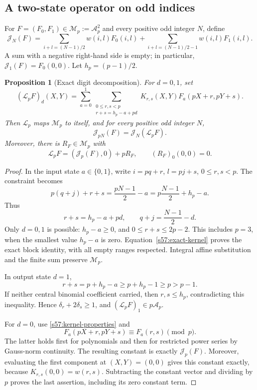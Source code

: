 \documentclass[11pt,a4paper]{article}
\numberwithin{equation}{section}
\newtheorem{proposition}[theorem]{Proposition}
\theoremstyle{remark}
\begin{document}
\subsection{A two-state operator on odd indices}

For \(F=(F_0,F_1)\in\mathcal M_p:=\mathcal A_p^2\) and every
positive odd integer \(N\), define
\[
 \mathcal J_N(F)=
 \sum_{i+l=(N-1)/2}w(i,l)F_0(i,l)
 +\sum_{i+l=(N-1)/2-1}w(i,l)F_1(i,l).
\]
A sum with a negative right-hand side is empty; in particular,
\(\mathcal J_1(F)=F_0(0,0)\). Let \(h_p=(p-1)/2\).

\begin{proposition}[Exact digit decomposition]
\label{s57:digit-operator}
For \(d=0,1\), set
\[
 (\mathcal L_pF)_d(X,Y)=
 \sum_{a=0}^1
 \sum_{\substack{0\le r,s<p\\r+s=h_p-a+pd}}
 K_{r,s}(X,Y)F_a(pX+r,pY+s).
\]
Then \(\mathcal L_p\) maps \(\mathcal M_p\) to itself, and for
every positive odd integer \(N\),
\[
                   \mathcal J_{pN}(F)=\mathcal J_N(\mathcal L_pF).
\]
Moreover, there is \(R_F\in\mathcal M_p\) with
\[
 \mathcal L_pF=(\mathcal J_p(F),0)+pR_F,
 \qquad (R_F)_0(0,0)=0.
\]
\end{proposition}
\begin{proof}
In the input state \(a\in\{0,1\}\), write \(i=pq+r\),
\(l=pj+s\), \(0\le r,s<p\). The constraint becomes
\[
 p(q+j)+r+s
     =\frac{pN-1}{2}-a
     =p\frac{N-1}{2}+h_p-a.
\]
Thus
\[
 r+s=h_p-a+pd,\qquad q+j=\frac{N-1}{2}-d.
\]
Only \(d=0,1\) is possible: \(h_p-a\ge0\), and
\(0\le r+s\le2p-2\). This includes \(p=3\), when the smallest
value \(h_p-a\) is zero. Equation~\eqref{s57:exact-kernel} proves
the exact block identity, with all empty ranges respected. Integral
affine substitution and the finite sum preserve \(\mathcal M_p\).

In output state \(d=1\),
\[
 r+s=p+h_p-a\ge p+h_p-1\ge p>p-1.
\]
If neither central binomial coefficient carried, then
\(r,s\le h_p\), contradicting this inequality. Hence
\(\delta_r+2\delta_s\ge1\), and
\((\mathcal L_pF)_1\in p\mathcal A_p\).

For \(d=0\), use \eqref{s57:kernel-properties} and
\[
 F_a(pX+r,pY+s)\equiv F_a(r,s)\pmod p.
\]
The latter holds first for polynomials and then for restricted power
series by Gauss-norm continuity. The resulting constant is exactly
\(\mathcal J_p(F)\). Moreover, evaluating the first component at
\((X,Y)=(0,0)\) gives this constant exactly, because
\(K_{r,s}(0,0)=w(r,s)\). Subtracting the constant vector and
dividing by \(p\) proves the last assertion, including its zero
constant term.
\end{proof}
\end{document}
